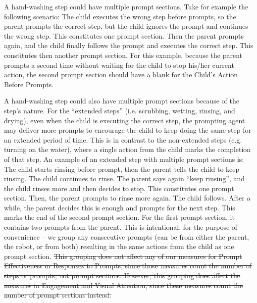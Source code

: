 \documentclass{ut-thesis}
\providecommand{\DIFdeltex}[1]{{\protect\color{red}\sout{#1}}}                      %
\providecommand{\DIFaddbegin}{} %
\providecommand{\DIFdelbegin}{} %
\providecommand{\DIFdelend}{} %
\providecommand{\DIFdel}[1]{\texorpdfstring{\DIFdeltex{#1}}{}} %
\begin{document}
A hand-washing step could have multiple prompt sections.  Take for example the following scenario: The child executes the wrong step before prompts, so the parent prompts the correct step, but the child ignores the prompt and continues the wrong step.  This constitutes one prompt section.  Then the parent prompts again, and the child finally follows the prompt and executes the correct step.  This constitutes then another prompt section.  For this example, because the parent prompts a second time without waiting for the child to stop his/her current action, the second prompt section should have a blank for the Child's Action Before Prompts.

A hand-washing step could also have multiple prompt sections because of the step's nature.  For the ``extended steps'' (i.e. scrubbing, wetting, rinsing, and drying), even when the child is executing the correct step, the prompting agent may deliver more prompts to encourage the child to keep doing the same step for an extended period of time.  This is in contrast to the non-extended steps (e.g. turning on the water), where a single action from the child marks the completion of that step.  An example of an extended step with multiple prompt sections is: The child starts rinsing before prompt, then the parent tells the child to keep rinsing.  The child continues to rinse.  The parent says again ``keep rinsing'', and the child rinses more and then decides to stop.  This constitutes one prompt section.  Then, the parent prompts to rinse more again.  The child follows.  After a while, the parent decides this is enough and prompts for the next step.  This marks the end of the second prompt section.  For the first prompt section, it contains two prompts from the parent.  This is intentional, for the purpose of convenience -- we group any consecutive prompts (can be from either the parent, the robot, or from both) resulting in the same actions from the child as one prompt section.
\DIFdelbegin \DIFdel{This grouping does not affect any of our measures for Prompt Effectiveness or Responses to Prompts, since those measures count the number of steps or prompts, not prompt sections.  However, this grouping does affect the measures in Engagement and Visual Attention, since these measures count the number of prompt sections instead.
}\DIFdelend 

\DIFaddbegin 
\end{document}
